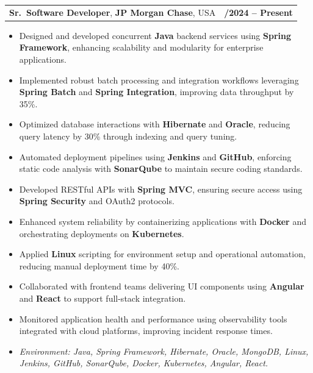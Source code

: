\documentclass[letterpaper,11pt]{article}
\makeatletter
\newcommand{\resumeItem}[1]{
  \item\footnotesize{
    {#1 \vspace{-2pt}}
  }
}
\newcommand{\resumeSubheading}[4]{
  \vspace{-2pt}\item
    \begin{tabular*}{1.0\textwidth}[t]{l@{\extracolsep{\fill}}r}
      \textbf{\fontsize{10pt}{14pt}\selectfont #3}, \textbf{\fontsize{10pt}{14pt}\selectfont #1}, \fontsize{10pt}{14pt}\selectfont #4 & \textbf{\fontsize{10pt}{14pt}\selectfont #2} \\
    \end{tabular*}\vspace{-7pt}
}
\newcommand{\resumeItemListStart}{\begin{itemize}[leftmargin=*]}
\newcommand{\resumeItemListEnd}{\end{itemize}\vspace{-5pt}}
\makeatother
\begin{document}
\resumeSubheading
{JP Morgan Chase}{09/2024 -- Present}
{Sr.\ Software Developer}{USA}
\resumeItemListStart
  \resumeItem{Designed and developed concurrent \textbf{Java} backend services using \textbf{Spring Framework}, enhancing scalability and modularity for enterprise applications.}
  \resumeItem{Implemented robust batch processing and integration workflows leveraging \textbf{Spring Batch} and \textbf{Spring Integration}, improving data throughput by 35\%.}
  \resumeItem{Optimized database interactions with \textbf{Hibernate} and \textbf{Oracle}, reducing query latency by 30\% through indexing and query tuning.}
  \resumeItem{Automated deployment pipelines using \textbf{Jenkins} and \textbf{GitHub}, enforcing static code analysis with \textbf{SonarQube} to maintain secure coding standards.}
  \resumeItem{Developed RESTful APIs with \textbf{Spring MVC}, ensuring secure access using \textbf{Spring Security} and OAuth2 protocols.}
  \resumeItem{Enhanced system reliability by containerizing applications with \textbf{Docker} and orchestrating deployments on \textbf{Kubernetes}.}
  \resumeItem{Applied \textbf{Linux} scripting for environment setup and operational automation, reducing manual deployment time by 40\%.}
  \resumeItem{Collaborated with frontend teams delivering UI components using \textbf{Angular} and \textbf{React} to support full-stack integration.}
  \resumeItem{Monitored application health and performance using observability tools integrated with cloud platforms, improving incident response times.}
  \resumeItem{\textit{Environment: Java, Spring Framework, Hibernate, Oracle, MongoDB, Linux, Jenkins, GitHub, SonarQube, Docker, Kubernetes, Angular, React.}}
\resumeItemListEnd
\end{document}

